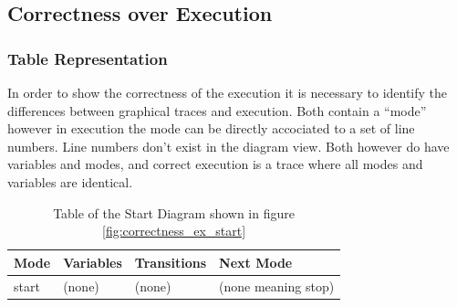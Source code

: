 \subsection{Correctness over Execution}
\subsubsection{Table Representation}

In order to show the correctness of the execution it is necessary to identify the differences between graphical traces and execution. Both contain a ``mode'' however in execution the mode can be directly accociated to a set of line numbers. Line numbers don't exist in the diagram view. Both however do have variables and modes, and correct execution is a trace where all modes and variables are identical.

\begin{table}[h]
	\caption{Table of the Start Diagram shown in figure \ref{fig:correctness_ex_start}}
	\centering
		\begin{tabular}{| l | l | l | l |}
			\hline
			\textbf{Mode} & \textbf{Variables} & \textbf{Transitions} & \textbf{Next Mode} \\
			\hline
			start & (none) & (none) & (none meaning stop) \\
			\hline
		\end{tabular}
	\label{table:BasicDiagOnly}
\end{table}
